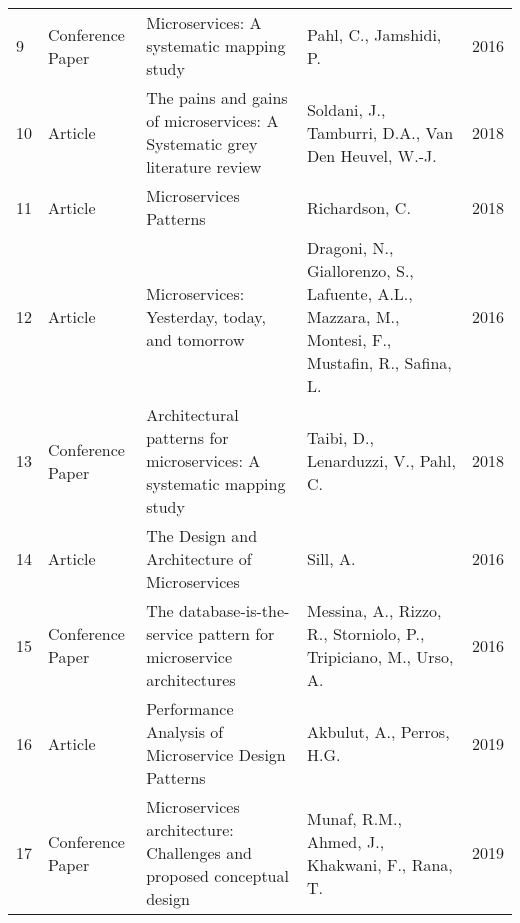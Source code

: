 \begin{table*}[!t]
\begin{tabular}{llp{3in}p{2in}r}
        9  & Conference Paper       & Microservices: A systematic mapping study                                                           & Pahl, C., Jamshidi, P.                                                                              & 2016          \\
        10 & Article                & The pains and gains of microservices: A Systematic grey literature review                           & Soldani, J., Tamburri, D.A., Van Den Heuvel, W.-J.                                                  & 2018          \\
        11 & Article                & Microservices Patterns                                                                              & Richardson, C.                                                                                      & 2018          \\
        12 & Article                & Microservices: Yesterday, today, and tomorrow                                                       & Dragoni, N., Giallorenzo, S., Lafuente, A.L., Mazzara, M., Montesi, F., Mustafin, R., Safina, L.    & 2016          \\
        13 & Conference Paper       & Architectural patterns for microservices: A systematic mapping study                                & Taibi, D., Lenarduzzi, V., Pahl, C.                                                                 & 2018          \\
        14 & Article                & The Design and Architecture of Microservices                                                        & Sill, A.                                                                                            & 2016          \\
        15 & Conference Paper       & The database-is-the-service pattern for microservice architectures                                  & Messina, A., Rizzo, R., Storniolo, P., Tripiciano, M., Urso, A.                                     & 2016          \\
        16 & Article                & Performance Analysis of Microservice Design Patterns                                                & Akbulut, A., Perros, H.G.                                                                           & 2019          \\
        17 & Conference Paper       & Microservices architecture: Challenges and proposed conceptual design                               & Munaf, R.M., Ahmed, J., Khakwani, F., Rana, T.                                                      & 2019          \\

\end{tabular}
\end{table*}
